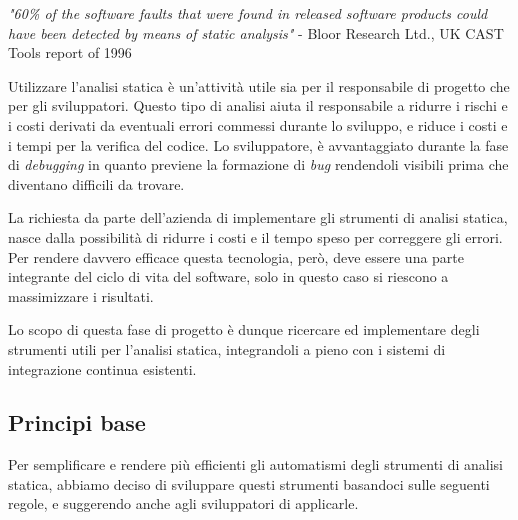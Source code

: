 \textit{"60\% of the software faults that were found in released software products could have been detected by means of static analysis"} - Bloor Research Ltd., UK CAST Tools report of 1996

Utilizzare l'analisi statica è un'attività utile sia per il responsabile di progetto che per gli sviluppatori. Questo tipo di analisi aiuta il responsabile a ridurre i rischi e i costi derivati da eventuali errori commessi durante lo sviluppo, e riduce i costi e i tempi per la verifica del codice. Lo sviluppatore, è avvantaggiato durante la fase di \textit{debugging} in quanto previene la formazione di \textit{bug} rendendoli visibili prima che diventano difficili da trovare.

La richiesta da parte dell'azienda di implementare gli strumenti di analisi statica, nasce dalla possibilità di ridurre i costi e il tempo speso per correggere gli errori. Per rendere davvero efficace questa tecnologia, però, deve essere una parte integrante del ciclo di vita del software, solo in questo caso si riescono a massimizzare i risultati.

Lo scopo di questa fase di progetto è dunque ricercare ed implementare degli strumenti utili per l'analisi statica, integrandoli a pieno con i sistemi di integrazione continua esistenti.

\subsection{Principi base}
Per semplificare e rendere più efficienti gli automatismi degli strumenti di analisi statica, abbiamo deciso di sviluppare questi strumenti basandoci sulle seguenti regole, e suggerendo anche agli sviluppatori di applicarle. 

